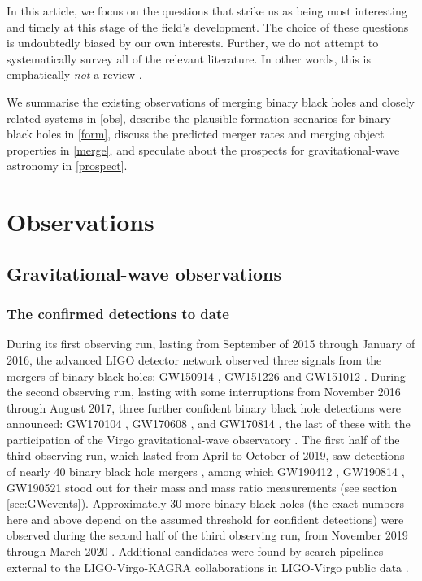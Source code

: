 \documentclass[review]{elsarticle}
\begin{document}
In this article, we focus on the questions that strike us as being most interesting and timely at this stage of the field's development.  The choice of these questions is undoubtedly biased by our own interests. Further, we do not attempt to systematically survey all of the relevant literature.  In other words, this is emphatically {\it not} a review \citep{magritte}. 

We summarise the existing observations of merging binary black holes and closely related systems in \autoref{obs}, describe the plausible formation scenarios for binary black holes in \autoref{form}, discuss the predicted merger rates and merging object properties in \autoref{merge}, and speculate about the prospects for gravitational-wave astronomy in \autoref{prospect}.


 

\section{Observations}\label{obs}

\subsection{Gravitational-wave observations}


\subsubsection{The confirmed detections to date}
During its first observing run, lasting from September of 2015 through January of 2016, the advanced LIGO detector network observed three signals from the mergers of binary black holes:  GW150914 \citep{GW150914}, GW151226 \citep{GW151226} and GW151012 \citep{GW150914:rates,BBH:O1}.  During the second observing run, lasting with some interruptions from November 2016 through August 2017, three further confident binary black hole detections were announced: GW170104 \citep{GW170104},  GW170608 \citep{GW170608}, and GW170814 \citep{GW170814}, the last of these with the participation of the Virgo gravitational-wave observatory \citep{AdvVirgo}.  The first half of the third observing run, which lasted from April to October of 2019, saw detections of nearly 40 binary black hole mergers \citep{GWTC2,Abbott:2021-GWTC-2-1}, among which GW190412 \citep{GW190412}, GW190814 \citep{GW190814}, GW190521 \citep{GW190521} stood out for their mass and mass ratio measurements (see section \ref{sec:GWevents}).  Approximately 30 more binary black holes (the exact numbers here and above depend on the assumed threshold for confident detections) were observed during the second half of the third observing run, from November 2019 through March 2020 \citep{GWTC3}.  Additional candidates were found by search pipelines external to the LIGO-Virgo-KAGRA collaborations in LIGO-Virgo public data \citep{Nitz:2019,Nitz:2021,Venumadhav:2019,Venumadhav:2020}.  
\end{document}
